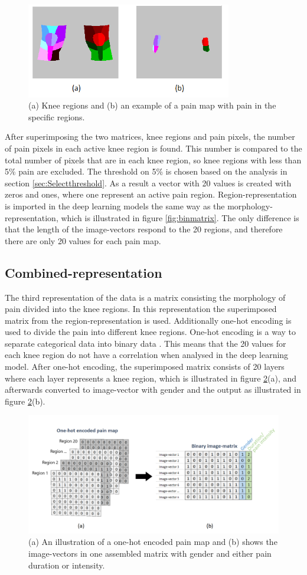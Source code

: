 \begin{figure} [H]
\centering
\includegraphics[width=0.8\textwidth]{figures/binregions}
\caption{(a) Knee regions and (b) an example of a pain map with pain in the specific regions.}
\label{fig:binregions}
\end{figure}

\noindent
After superimposing the two matrices, knee regions and pain pixels, the number of pain pixels in each active knee region is found. This number is compared to the total number of pixels that are in each knee region, so knee regions with less than 5\% pain are excluded. The threshold on 5\% is chosen based on the analysis in section \ref{sec:Selectthreshold}. As a result a vector with 20 values is created with zeros and ones, where one represent an active pain region. Region-representation is imported in the deep learning models the same way as the morphology-representation, which is illustrated in figure \ref{fig:binmatrix}. The only difference is that the length of the image-vectors respond to the 20 regions, and therefore there are only 20 values for each pain map.


\subsection{Combined-representation} \label{sec:combined}
The third representation of the data is a matrix consisting the morphology of pain divided into the knee regions.
\noindent
In this representation the superimposed matrix from the region-representation is used. Additionally one-hot encoding is used to divide the pain into different knee regions. One-hot encoding is a way to separate categorical data into binary data \citep{Harris2012}. This means that the 20 values for each knee region do not have a correlation when analysed in the deep learning model. After one-hot encoding, the superimposed matrix consists of 20 layers where each layer represents a knee region, which is illustrated in figure \ref{fig:onehot}(a), and afterwards converted to image-vector with gender and the output as illustrated in figure \ref{fig:onehot}(b).

\begin{figure} [H]
\centering
\includegraphics[width=1\textwidth]{figures/onehotmatrix}
\caption{(a) An illustration of a one-hot encoded pain map and (b) shows the image-vectors in one assembled matrix with gender and either pain duration or intensity.}
\label{fig:onehot}
\end{figure}
